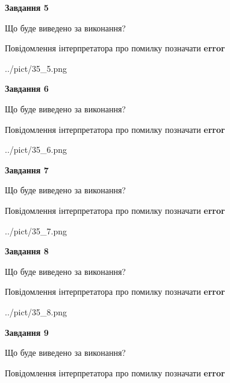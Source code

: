 \documentclass[11pt, ukrainian]{article}
\begin{document}
{\begin {large}
{\begin {center}\textbf{Завдання 5}\end {center}}\par
Що буде виведено за виконання? \par
Повідомлення інтерпретатора про помилку позначати \textbf{error}

\begin{center}
	{../pict/35_5.png}
\end{center}
\newpage

{\begin {center}\textbf{Завдання 6}\end {center}}\par
Що буде виведено за виконання? \par
Повідомлення інтерпретатора про помилку позначати \textbf{error}

\begin{center}
	{../pict/35_6.png}
\end{center}
\newpage

{\begin {center}\textbf{Завдання 7}\end {center}}\par
Що буде виведено за виконання? \par
Повідомлення інтерпретатора про помилку позначати \textbf{error}

\begin{center}
	{../pict/35_7.png}
\end{center}
\newpage

{\begin {center}\textbf{Завдання 8}\end {center}}\par
Що буде виведено за виконання? \par
Повідомлення інтерпретатора про помилку позначати \textbf{error}

\begin{center}
	{../pict/35_8.png}
\end{center}
\newpage

{\begin {center}\textbf{Завдання 9}\end {center}}\par
Що буде виведено за виконання? \par
Повідомлення інтерпретатора про помилку позначати \textbf{error}


\end{large}}
\end{document}
